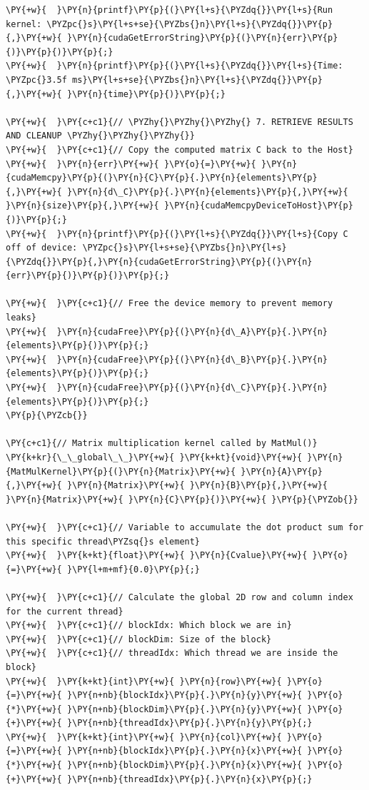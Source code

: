 \begin{Verbatim}[label=\makebox{\url{https://github.com/lucabaldini/cmepda/tree/master/slides/latex/snippets/MatrixMultiplication_global.cu}},commandchars=\\\{\}]
\PY{+w}{  }\PY{n}{printf}\PY{p}{(}\PY{l+s}{\PYZdq{}}\PY{l+s}{Run kernel: \PYZpc{}s}\PY{l+s+se}{\PYZbs{}n}\PY{l+s}{\PYZdq{}}\PY{p}{,}\PY{+w}{ }\PY{n}{cudaGetErrorString}\PY{p}{(}\PY{n}{err}\PY{p}{)}\PY{p}{)}\PY{p}{;}
\PY{+w}{  }\PY{n}{printf}\PY{p}{(}\PY{l+s}{\PYZdq{}}\PY{l+s}{Time: \PYZpc{}3.5f ms}\PY{l+s+se}{\PYZbs{}n}\PY{l+s}{\PYZdq{}}\PY{p}{,}\PY{+w}{ }\PY{n}{time}\PY{p}{)}\PY{p}{;}

\PY{+w}{  }\PY{c+c1}{// \PYZhy{}\PYZhy{}\PYZhy{} 7. RETRIEVE RESULTS AND CLEANUP \PYZhy{}\PYZhy{}\PYZhy{}}
\PY{+w}{  }\PY{c+c1}{// Copy the computed matrix C back to the Host}
\PY{+w}{  }\PY{n}{err}\PY{+w}{ }\PY{o}{=}\PY{+w}{ }\PY{n}{cudaMemcpy}\PY{p}{(}\PY{n}{C}\PY{p}{.}\PY{n}{elements}\PY{p}{,}\PY{+w}{ }\PY{n}{d\_C}\PY{p}{.}\PY{n}{elements}\PY{p}{,}\PY{+w}{ }\PY{n}{size}\PY{p}{,}\PY{+w}{ }\PY{n}{cudaMemcpyDeviceToHost}\PY{p}{)}\PY{p}{;}
\PY{+w}{  }\PY{n}{printf}\PY{p}{(}\PY{l+s}{\PYZdq{}}\PY{l+s}{Copy C off of device: \PYZpc{}s}\PY{l+s+se}{\PYZbs{}n}\PY{l+s}{\PYZdq{}}\PY{p}{,}\PY{n}{cudaGetErrorString}\PY{p}{(}\PY{n}{err}\PY{p}{)}\PY{p}{)}\PY{p}{;}

\PY{+w}{  }\PY{c+c1}{// Free the device memory to prevent memory leaks}
\PY{+w}{  }\PY{n}{cudaFree}\PY{p}{(}\PY{n}{d\_A}\PY{p}{.}\PY{n}{elements}\PY{p}{)}\PY{p}{;}
\PY{+w}{  }\PY{n}{cudaFree}\PY{p}{(}\PY{n}{d\_B}\PY{p}{.}\PY{n}{elements}\PY{p}{)}\PY{p}{;}
\PY{+w}{  }\PY{n}{cudaFree}\PY{p}{(}\PY{n}{d\_C}\PY{p}{.}\PY{n}{elements}\PY{p}{)}\PY{p}{;}
\PY{p}{\PYZcb{}}

\PY{c+c1}{// Matrix multiplication kernel called by MatMul()}
\PY{k+kr}{\_\_global\_\_}\PY{+w}{ }\PY{k+kt}{void}\PY{+w}{ }\PY{n}{MatMulKernel}\PY{p}{(}\PY{n}{Matrix}\PY{+w}{ }\PY{n}{A}\PY{p}{,}\PY{+w}{ }\PY{n}{Matrix}\PY{+w}{ }\PY{n}{B}\PY{p}{,}\PY{+w}{ }\PY{n}{Matrix}\PY{+w}{ }\PY{n}{C}\PY{p}{)}\PY{+w}{ }\PY{p}{\PYZob{}}

\PY{+w}{  }\PY{c+c1}{// Variable to accumulate the dot product sum for this specific thread\PYZsq{}s element}
\PY{+w}{  }\PY{k+kt}{float}\PY{+w}{ }\PY{n}{Cvalue}\PY{+w}{ }\PY{o}{=}\PY{+w}{ }\PY{l+m+mf}{0.0}\PY{p}{;}

\PY{+w}{  }\PY{c+c1}{// Calculate the global 2D row and column index for the current thread}
\PY{+w}{  }\PY{c+c1}{// blockIdx: Which block we are in}
\PY{+w}{  }\PY{c+c1}{// blockDim: Size of the block}
\PY{+w}{  }\PY{c+c1}{// threadIdx: Which thread we are inside the block}
\PY{+w}{  }\PY{k+kt}{int}\PY{+w}{ }\PY{n}{row}\PY{+w}{ }\PY{o}{=}\PY{+w}{ }\PY{n+nb}{blockIdx}\PY{p}{.}\PY{n}{y}\PY{+w}{ }\PY{o}{*}\PY{+w}{ }\PY{n+nb}{blockDim}\PY{p}{.}\PY{n}{y}\PY{+w}{ }\PY{o}{+}\PY{+w}{ }\PY{n+nb}{threadIdx}\PY{p}{.}\PY{n}{y}\PY{p}{;}
\PY{+w}{  }\PY{k+kt}{int}\PY{+w}{ }\PY{n}{col}\PY{+w}{ }\PY{o}{=}\PY{+w}{ }\PY{n+nb}{blockIdx}\PY{p}{.}\PY{n}{x}\PY{+w}{ }\PY{o}{*}\PY{+w}{ }\PY{n+nb}{blockDim}\PY{p}{.}\PY{n}{x}\PY{+w}{ }\PY{o}{+}\PY{+w}{ }\PY{n+nb}{threadIdx}\PY{p}{.}\PY{n}{x}\PY{p}{;}


\end{Verbatim}
